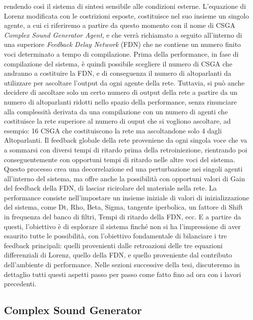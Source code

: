 rendendo così il sistema di sintesi sensibile alle condizioni esterne.
L'equazione di Lorenz modificata con le costrizioni esposte,
costituisce nel suo insieme un singolo agente, a cui ci riferiremo a partire da questo
momento con il nome di CSGA \textit{Complex Sound Generator Agent}, e che verrà richiamato a seguito
all'interno di una superiore \textit{Feedback Delay Network} (FDN) che ne contiene un 
numero finito voci determinato a tempo di compilazione. 
Prima della performance, in fase di compilazione del sistema,
è quindi possibile scegliere il numero di CSGA che andranno a costituire 
la FDN, e di conseguenza il numero di altoparlanti da utilizzare
per ascoltare l'output da ogni agente della rete.
Tuttavia, si può anche decidere di ascoltare solo un certo numero di output
della rete a partire da un numero di altoparlanti ridotti nello spazio della performance,
senza rinunciare alla complessità derivata da una compilazione con un
numero di agenti che costituisce la rete superiore al numero di ouput che si vogliono ascoltare, 
ad esempio: 16 CSGA che costituiscono la rete ma ascoltandone solo 4 dagli Altoparlanti.
Il feedback globale della rete proveniene da ogni singola voce 
che va a sommarsi con diversi tempi di ritardo prima della retroiniezione,
rientrando poi conseguentemente con opportuni tempi di ritardo nelle altre voci del sistema.
Questo processo crea una decorrelazione ed una perturbazione nei singoli agenti all'interno del sistema,
ma offre anche la possibilità con opportuni valori di Gain del feedback della FDN, 
di lasciar ricirolare del materiale nella rete.
La performance consiste nell'impostare un insieme iniziale di valori 
di inizializzazione del sistema, come Dt, Rho, Beta, Sigma, 
tangente iperbolica, 
un fattore di Shift in frequenza del banco di filtri, 
Tempi di ritardo della FDN, ecc.
E a partire da questi, l'obiettivo è di esplorare il sistema 
finché non si ha l'impressione di aver esaurito tutte le possibilità, 
con l'obiettivo fondamentale di bilanciare i tre feedback principali: 
quelli provenienti dalle retroazioni delle tre equazioni differenziali 
di Lorenz, quello della FDN, e quello proveniente dal contributo 
dell'ambiente di performance.
Nelle sezioni successive della tesi, 
discuteremo in dettaglio tutti questi aspetti passo per passo
come fatto fino ad ora con i lavori precedenti. 

\subsection{Complex Sound Generator}
\label{Complex Sound Generators}

